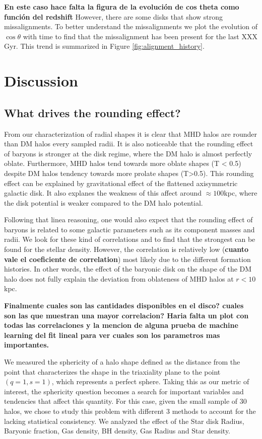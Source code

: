 \documentclass[a4paper,fleqn,usenatbib]{mnras}
\begin{document}
{\bf En este caso hace falta la figura de la evoluci\'on de cos theta
  como funci\'on del redshift}
However, there are some disks that show strong missalignments. 
To better understand the missalignments we plot the evolution of
$\cos\theta$ with time to find that the missalignment has been present
for the last XXX Gyr.
This trend is summarized in Figure \ref{fig:alignment_history}.


\section{Discussion}


\subsection{What drives the rounding effect?}

From our characterization of radial shapes it is clear that
MHD halos are rounder than DM halos every sampled radii. 
It is also noticeable that the rounding effect of baryons is stronger
at the disk regime, where the DM halo is almost perfectly oblate. 
Furthermore, MHD halos tend towards more oblate shapes (T < 0.5)
despite DM halos tendency towards more prolate shapes (T>0.5). 
This rounding effect can be explained by gravitational effect of the
flattened axisymmetric galactic disk. 
It also explanes the weakness of this affect around $\approx 100$kpc,
where the disk potential is weaker compared to the DM halo potential. 

Following that linea reasoning, one would also expect that the rounding
effect of baryons is related to some  galactic parameters such as its
component masses and radii. 
We look for these kind of correlations and to find that the strongest
can be found for the stellar density.
However, the correlation is relatively low ({\bf cuanto vale el
  coeficiente de correlation}) most likely due to the different
formation histories.
In other words, the effect of the baryonic disk on the shape of the DM halo
does not fully explain the deviation from oblateness of MHD halos at
$r<10$kpc. 

{\bf Finalmente cuales son las cantidades disponibles en el disco?
  cuales son las que muestran una mayor correlacion? Haria falta un
  plot con todas las correlaciones y la mencion de alguna prueba de
  machine learning del fit lineal para ver cuales son los parametros
  mas importantes.}
  
  We measured the sphericity of a halo shape defined as the distance 
  from the point that characterizes the shape in the triaxiality plane
  to the point $(q=1,s=1)$, which represents a perfect sphere. Taking this 
  as our metric of interest, the sphericity question becomes a search for
  important variables and tendencies that affect this quantity. For this case,
  given the small sample of 30 halos, we chose to study this problem with different 
  3 methods to account for the lacking statistical consistency. We analyzed the effect
  of the Star disk Radius, Baryonic fraction, Gas density, BH density, Gas Radius and
  Star density.\\
   
\end{document}
